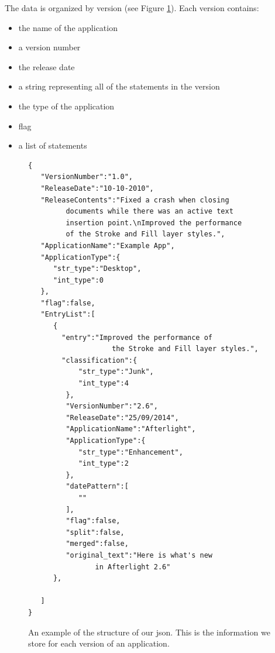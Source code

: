 \documentclass{acm_proc_article-sp}
\begin{document}
The data is organized by version (see Figure \ref{fig:jsonEx}). Each version contains: 
\begin{itemize}
	\item the name of the application
	\item a version number
	\item the release date
	\item a string representing all of the statements in the version
	\item the type of the application
	\item flag
	\item a list of statements
\end{itemize}


\begin{figure}
\begin{verbatim}
{  
   "VersionNumber":"1.0",
   "ReleaseDate":"10-10-2010",
   "ReleaseContents":"Fixed a crash when closing
   		 documents while there was an active text 
   		 insertion point.\nImproved the performance 
   		 of the Stroke and Fill layer styles.",
   "ApplicationName":"Example App",
   "ApplicationType":{  
      "str_type":"Desktop",
      "int_type":0
   },
   "flag":false,
   "EntryList":[  
      {  
 		"entry":"Improved the performance of 
 		         	the Stroke and Fill layer styles.",
        "classification":{  
            "str_type":"Junk",
            "int_type":4
         },
         "VersionNumber":"2.6",
         "ReleaseDate":"25/09/2014",
         "ApplicationName":"Afterlight",
         "ApplicationType":{  
            "str_type":"Enhancement",
            "int_type":2
         },
         "datePattern":[  
            ""
         ],
         "flag":false,
         "split":false,
         "merged":false,
         "original_text":"Here is what's new 
         		in Afterlight 2.6"
      },
    
   ]
}
\end{verbatim}
\caption{An example of the structure of our json. This is the information we store for each version of an application.}
\label{fig:jsonEx}
\end{figure}
\end{document}
